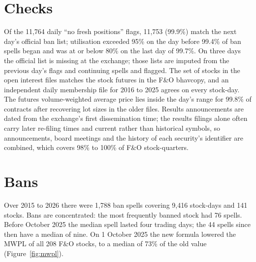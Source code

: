 \section{Checks}
Of the 11,764 daily ``no fresh positions'' flags, 11,753 (99.9\%) match the next day's official ban list; utilisation
exceeded 95\% on the day before 99.4\% of ban spells began and was at or below 80\% on the last day of 99.7\%. On three days
the official list is missing at the exchange; those lists are imputed from the previous day's flags and continuing spells
and flagged. The set of stocks in the open interest files matches the stock futures in the F\&O bhavcopy, and an
independent daily membership file for 2016 to 2025 agrees on every stock-day. The futures volume-weighted average price
lies inside the day's range for 99.8\% of contracts after recovering lot sizes in the older files. Results announcements
are dated from the exchange's first dissemination time; the results filings alone often carry later re-filing times and
current rather than historical symbols, so announcements, board meetings and the history of each security's identifier
are combined, which covers 98\% to 100\% of F\&O stock-quarters.

\section{Bans}
\begin{table}[t]
\caption[F\&O bans by year, 2015 to 2026]{Bans are frequent, concentrated in a few stocks, and longer under the new rule}\label{tab:bans}
\centering{\footnotesize\setlength{\tabcolsep}{4pt}}
\end{table}
Over 2015 to 2026 there were 1,788 ban spells covering 9,416 stock-days and 141 stocks. Bans are concentrated: the most
frequently banned stock had 76 spells. Before October 2025 the median spell lasted four trading days; the 44 spells since
then have a median of nine. On 1 October 2025 the new formula lowered the MWPL of all 208 F\&O stocks, to a median of 73\%
of the old value (Figure~\ref{fig:mwpl}).

